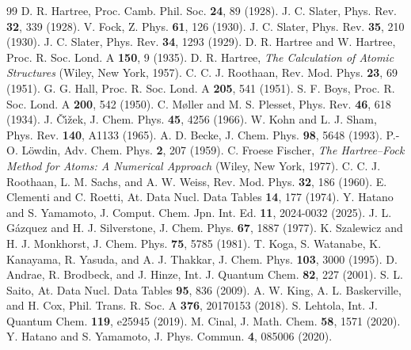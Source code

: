 \documentclass[aps,pra,reprint,superscriptaddress,amsmath,amssymb,longbibliography]{revtex4-2}
\begin{document}
\begin{thebibliography}{99}
 D. R. Hartree, Proc. Camb. Phil. Soc. \textbf{24}, 89 (1928).
 J. C. Slater, Phys. Rev. \textbf{32}, 339 (1928).
 V. Fock, Z. Phys. \textbf{61}, 126 (1930).
 J. C. Slater, Phys. Rev. \textbf{35}, 210 (1930).
 J. C. Slater, Phys. Rev. \textbf{34}, 1293 (1929).
 D. R. Hartree and W. Hartree, Proc. R. Soc. Lond. A \textbf{150}, 9 (1935).
 D. R. Hartree, \textit{The Calculation of Atomic Structures} (Wiley, New York, 1957).
 C. C. J. Roothaan, Rev. Mod. Phys. \textbf{23}, 69 (1951).
 G. G. Hall, Proc. R. Soc. Lond. A \textbf{205}, 541 (1951).
 S. F. Boys, Proc. R. Soc. Lond. A \textbf{200}, 542 (1950).
 C. M{\o}ller and M. S. Plesset, Phys. Rev. \textbf{46}, 618 (1934).
 J. \v{C}\'{\i}\v{z}ek, J. Chem. Phys. \textbf{45}, 4256 (1966).
 W. Kohn and L. J. Sham, Phys. Rev. \textbf{140}, A1133 (1965).
 A. D. Becke, J. Chem. Phys. \textbf{98}, 5648 (1993).
 P.-O. L\"owdin, Adv. Chem. Phys. \textbf{2}, 207 (1959).
 C. Froese Fischer, \textit{The Hartree--Fock Method for Atoms: A Numerical Approach} (Wiley, New York, 1977).
 C. C. J. Roothaan, L. M. Sachs, and A. W. Weiss, Rev. Mod. Phys. \textbf{32}, 186 (1960).
 E. Clementi and C. Roetti, At. Data Nucl. Data Tables \textbf{14}, 177 (1974).
 Y. Hatano and S. Yamamoto, J. Comput. Chem. Jpn. Int. Ed. \textbf{11}, 2024-0032 (2025).
 J. L. G\'azquez and H. J. Silverstone, J. Chem. Phys. \textbf{67}, 1887 (1977).
 K. Szalewicz and H. J. Monkhorst, J. Chem. Phys. \textbf{75}, 5785 (1981).
 T. Koga, S. Watanabe, K. Kanayama, R. Yasuda, and A. J. Thakkar, J. Chem. Phys. \textbf{103}, 3000 (1995).
 D. Andrae, R. Brodbeck, and J. Hinze, Int. J. Quantum Chem. \textbf{82}, 227 (2001).
 S. L. Saito, At. Data Nucl. Data Tables \textbf{95}, 836 (2009).
 A. W. King, A. L. Baskerville, and H. Cox, Phil. Trans. R. Soc. A \textbf{376}, 20170153 (2018).
 S. Lehtola, Int. J. Quantum Chem. \textbf{119}, e25945 (2019).
 M. Cinal, J. Math. Chem. \textbf{58}, 1571 (2020).
 Y. Hatano and S. Yamamoto, J. Phys. Commun. \textbf{4}, 085006 (2020).

\end{thebibliography}
\end{document}
